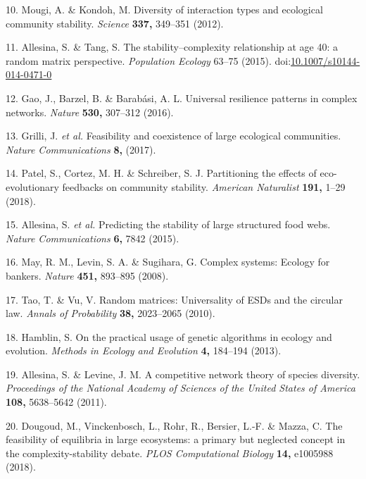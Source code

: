 \documentclass[]{article}
\begin{document}
\hypertarget{ref-Mougi2012}{}
10. Mougi, A. \& Kondoh, M. Diversity of interaction types and
ecological community stability. \emph{Science} \textbf{337,} 349--351
(2012).

\hypertarget{ref-Allesina2015a}{}
11. Allesina, S. \& Tang, S. The stability--complexity relationship at
age 40: a random matrix perspective. \emph{Population Ecology} 63--75
(2015).
doi:\href{https://doi.org/10.1007/s10144-014-0471-0}{10.1007/s10144-014-0471-0}

\hypertarget{ref-Gao2016}{}
12. Gao, J., Barzel, B. \& Barabási, A. L. Universal resilience patterns
in complex networks. \emph{Nature} \textbf{530,} 307--312 (2016).

\hypertarget{ref-Grilli2017}{}
13. Grilli, J. \emph{et al.} Feasibility and coexistence of large
ecological communities. \emph{Nature Communications} \textbf{8,} (2017).

\hypertarget{ref-Patel2018}{}
14. Patel, S., Cortez, M. H. \& Schreiber, S. J. Partitioning the
effects of eco-evolutionary feedbacks on community stability.
\emph{American Naturalist} \textbf{191,} 1--29 (2018).

\hypertarget{ref-Allesina2015}{}
15. Allesina, S. \emph{et al.} Predicting the stability of large
structured food webs. \emph{Nature Communications} \textbf{6,} 7842
(2015).

\hypertarget{ref-May2008}{}
16. May, R. M., Levin, S. A. \& Sugihara, G. Complex systems: Ecology
for bankers. \emph{Nature} \textbf{451,} 893--895 (2008).

\hypertarget{ref-Tao2010}{}
17. Tao, T. \& Vu, V. Random matrices: Universality of ESDs and the
circular law. \emph{Annals of Probability} \textbf{38,} 2023--2065
(2010).

\hypertarget{ref-Hamblin2013}{}
18. Hamblin, S. On the practical usage of genetic algorithms in ecology
and evolution. \emph{Methods in Ecology and Evolution} \textbf{4,}
184--194 (2013).

\hypertarget{ref-Allesina2011}{}
19. Allesina, S. \& Levine, J. M. A competitive network theory of
species diversity. \emph{Proceedings of the National Academy of Sciences
of the United States of America} \textbf{108,} 5638--5642 (2011).

\hypertarget{ref-Dougoud2018}{}
20. Dougoud, M., Vinckenbosch, L., Rohr, R., Bersier, L.-F. \& Mazza, C.
The feasibility of equilibria in large ecosystems: a primary but
neglected concept in the complexity-stability debate. \emph{PLOS
Computational Biology} \textbf{14,} e1005988 (2018).
\end{document}
